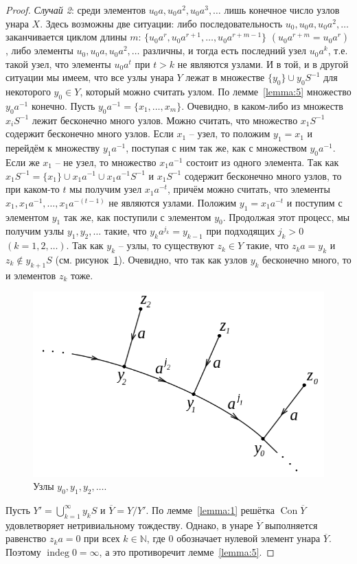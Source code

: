 \documentclass[11pt,twoside,final
]{article}
\def\Con{\operatorname{Con}}
\def\indeg{\operatorname{indeg}}
\begin{document}
\begin{proof}
	\textit{Случай 2}: среди элементов $u_0 a,u_0 a^{2},u_0 a^{3},\ldots$ лишь конечное число узлов унара $X$.
	Здесь возможны две ситуации: либо последовательность $u_0, u_0 a, u_0 a^2, \ldots$ заканчивается циклом длины $m$: $\{ u_0 a^r, u_0 a^{r + 1}, \ldots, u_0 a^{r + m - 1} \}$ $(u_0 a^{r + m} = u_0 a^r)$, либо элементы $u_0, u_0 a, u_0 a^2, \ldots$ различны, и тогда есть последний узел $u_0 a^k$, т.е. такой узел, что элементы $u_0 a^t$ при $t > k$ не являются узлами.
	И в той, и в другой ситуации мы имеем, что все узлы унара $Y$ лежат в множестве $\{ y_0 \} \cup y_0 S^{-1}$ для некоторого $y_0 \in Y$, который можно считать узлом.
	По лемме~\ref{lemma:5} множество $y_0 a^{-1}$ конечно.
	Пусть $y_0 a^{-1} = \{ x_1, \ldots, x_m \}$.
	Очевидно, в каком-либо из множеств $x_i S^{-1}$ лежит бесконечно много узлов.
	Можно считать, что множество $x_1 S^{-1}$ содержит бесконечно много узлов.
	Если $x_1$ -- узел, то положим $y_1 = x_1$ и перейдём к множеству $y_1 a^{-1}$, поступая с ним так же, как с множеством $y_0 a^{-1}$.
	Если же $x_1$ -- не узел, то множество $x_1 a^{-1}$ состоит из одного элемента.
	Так как $x_1 S^{-1} = \{ x_1 \} \cup x_1 a^{-1} \cup x_1 a^{-1} S^{-1} $ и $x_1 S^{-1}$ содержит бесконечно много узлов, то при каком-то $t$ мы получим узел $x_1 a^{-t}$, причём можно считать, что элементы $x_1, x_1 a^{-1}, \ldots, x_1 a^{-(t-1)}$ не являются узлами.
	Положим $y_1 = x_1 a^{-t}$ и поступим с элементом $y_1$ так же, как поступили с элементом $y_0$.
	Продолжая этот процесс, мы получим узлы $y_1,y_2,\ldots$ такие, что $y_k a^{j_k} = y_{k - 1}$ при подходящих $j_k > 0$ $(k = 1,2,\ldots)$.
	Так как $y_k$ -- узлы, то существуют $z_k \in Y$ такие, что $z_k a = y_k$ и $z_k \notin y_{k + 1}S$ (см. рисунок~\ref{fig:uzly_4}).
	Очевидно, что так как узлов $y_k$ бесконечно много, то и элементов $z_k$ тоже.
	\begin{figure}[ht!]
		\centering
		\includegraphics[scale=0.45]{img/uzly_4.png}
		\caption{Узлы $y_0, y_1, y_2, \ldots$.}
		\label{fig:uzly_4}
	\end{figure}
	Пусть $Y' = \bigcup_{k=1}^{\infty} y_k S$ и $\overline{Y} = Y / Y'$.
	По лемме~\ref{lemma:1} решётка $\Con \overline{Y}$ удовлетворяет нетривиальному тождеству.
	Однако, в унаре $\overline{Y}$ выполняется равенство $z_k a = 0$ при всех $k \in \mathbb{N}$, где $0$ обозначает нулевой элемент унара $\overline{Y}$.
	Поэтому $\indeg 0 = \infty$, а это противоречит лемме~\ref{lemma:5}.
\end{proof}
\end{document}
